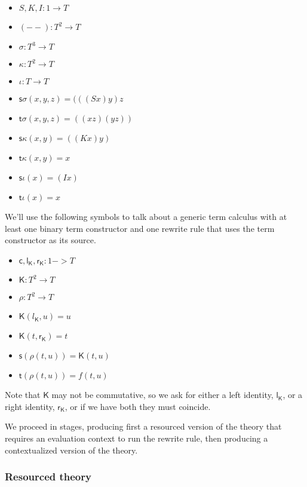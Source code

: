 \documentclass{llncs}
\renewcommand{\:}{\colon}
\begin{document}
\begin{itemize}
  \item $S, K, I : 1 \rightarrow T$
  \item $(- -) : T^{2} \rightarrow T$
  \item $\sigma : T^{3} \rightarrow T$
  \item $\kappa : T^{2} \rightarrow T$
  \item $\iota : T \rightarrow T$
  \item $\mathsf{s}\sigma(x, y, z) = (((S x) y) z$
  \item $\mathsf{t}\sigma(x, y, z) = ((x z) (y z))$
  \item $\mathsf{s}\kappa(x, y) = ((K x) y)$
  \item $\mathsf{t}\kappa(x, y) = x$
  \item $\mathsf{s}\iota(x) = (I x)$
  \item $\mathsf{t}\iota(x) = x$
\end{itemize}

We'll use the following symbols to talk about a generic term calculus
with at least one binary term constructor and one rewrite rule that
uses the term constructor as its source.

\begin{itemize}
  \item $\mathsf{c}, \mathsf{l}_{\mathsf{K}}, \mathsf{r}_{\mathsf{K}} : 1 -> T$
  \item $\mathsf{K} : T^{2} \rightarrow T$
  \item $\rho : T^{2} \rightarrow T$             %
  \item $\mathsf{K}(l_{\mathsf{K}}, u) = u$
  \item $\mathsf{K}(t, \mathsf{r}_{\mathsf{K}}) = t$
  \item $\mathsf{s}(\rho(t,u)) = \mathsf{K}(t, u)$
  \item $\mathsf{t}(\rho(t,u)) = f(t,u)$
\end{itemize}

Note that $\mathsf{K}$ may not be commutative, so we ask for either a left
identity, $\mathsf{l}_{\mathsf{K}}$, or a right identity, $\mathsf{r}_{\mathsf{K}}$, or if we have both they must
coincide.

We proceed in stages, producing first a resourced version of the
theory that requires an evaluation context to run the rewrite rule,
then producing a contextualized version of the theory.

\subsubsection{Resourced theory}
\end{document}
